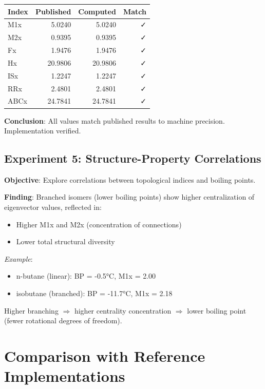 \documentclass[12pt]{article}
\begin{document}
\begin{table}[H]
\centering
\begin{tabular}{|l|r|r|r|}
\hline
\textbf{Index} & \textbf{Published} & \textbf{Computed} & \textbf{Match} \\
\hline
M1x & 5.0240 & 5.0240 & ✓ \\
M2x & 0.9395 & 0.9395 & ✓ \\
Fx & 1.9476 & 1.9476 & ✓ \\
Hx & 20.9806 & 20.9806 & ✓ \\
ISx & 1.2247 & 1.2247 & ✓ \\
RRx & 2.4801 & 2.4801 & ✓ \\
ABCx & 24.7841 & 24.7841 & ✓ \\
\hline
\end{tabular}
\end{table}

\textbf{Conclusion}: All values match published results to machine precision. Implementation verified.

\subsection{Experiment 5: Structure-Property Correlations}

\textbf{Objective}: Explore correlations between topological indices and boiling points.

\textbf{Finding}: Branched isomers (lower boiling points) show higher centralization of eigenvector values, reflected in:
\begin{itemize}
    \item Higher M1x and M2x (concentration of connections)
    \item Lower total structural diversity
\end{itemize}

\textit{Example}:
\begin{itemize}
    \item n-butane (linear): BP = -0.5°C, M1x = 2.00
    \item isobutane (branched): BP = -11.7°C, M1x = 2.18
\end{itemize}

Higher branching $\Rightarrow$ higher centrality concentration $\Rightarrow$ lower boiling point (fewer rotational degrees of freedom).

\section{Comparison with Reference Implementations}
\end{document}
